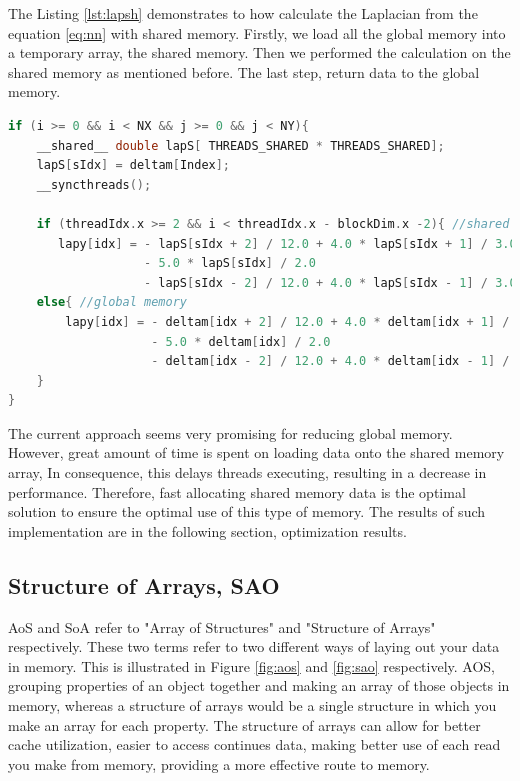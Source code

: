 The Listing \ref{lst:lapsh} demonstrates to how calculate the Laplacian from the equation \ref{eq:nn} with shared memory. Firstly, we load all the global memory into a temporary array, the shared memory. Then we performed the calculation on the shared memory as mentioned before. The last step, return data to the global memory.

\begin{lstlisting}[language=C++, label={lst:lapsh}, caption={Laplacian evaluating using shared memory with boundaries condition}]
if (i >= 0 && i < NX && j >= 0 && j < NY){
    __shared__ double lapS[ THREADS_SHARED * THREADS_SHARED];
    lapS[sIdx] = deltam[Index];
    __syncthreads();

    if (threadIdx.x >= 2 && i < threadIdx.x - blockDim.x -2){ //shared
       lapy[idx] = - lapS[sIdx + 2] / 12.0 + 4.0 * lapS[sIdx + 1] / 3.0
			  	   - 5.0 * lapS[sIdx] / 2.0
			  	   - lapS[sIdx - 2] / 12.0 + 4.0 * lapS[sIdx - 1] / 3.0;
	else{ //global memory
		lapy[idx] = - deltam[idx + 2] / 12.0 + 4.0 * deltam[idx + 1] / 3.0
			  		- 5.0 * deltam[idx] / 2.0
			  		- deltam[idx - 2] / 12.0 + 4.0 * deltam[idx - 1] / 3.0;
	}
}
\end{lstlisting}

The current approach seems very promising for reducing global memory. However, great amount of time is spent on loading data onto the shared memory array, In consequence, this delays threads executing, resulting in a decrease in performance. Therefore, fast allocating shared memory data is the optimal solution to ensure the optimal use of this type of memory. The results of such implementation are in the following section, optimization results.

\subsection{Structure of Arrays, SAO}

AoS and SoA refer to "Array of Structures" and "Structure of Arrays" respectively. These two terms refer to two different ways of laying out your data in memory. This is illustrated in Figure \ref{fig:aos} and \ref{fig:sao} respectively. AOS, grouping properties of an object together and making an array of those objects in memory, whereas a structure of arrays would be a single structure in which you make an array for each property. The structure of arrays can allow for better cache utilization, easier to access continues data, making better use of each read you make from memory, providing a more effective route to memory. 

